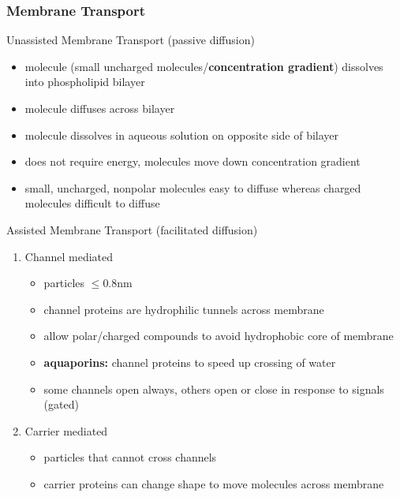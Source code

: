 \documentclass[11pt,fleqn]{book} %
\begin{document}
\subsubsection{Membrane Transport}
\begin{descriptions}
    \item[Unassisted Membrane Transport (passive diffusion)]\begin{descriptions}
    \end{descriptions}
    \begin{itemize}
        \item molecule (small uncharged molecules/\textbf{concentration gradient}) dissolves into phospholipid bilayer
        \item molecule diffuses across bilayer
        \item molecule dissolves in aqueous solution on opposite side of bilayer
        \item does not require energy, molecules move down concentration gradient
        \item small, uncharged, nonpolar molecules easy to diffuse whereas charged molecules difficult to diffuse
    \end{itemize}
    \item[Assisted Membrane Transport (facilitated diffusion)]\begin{descriptions}
    \end{descriptions}
    \begin{enumerate}
        \item Channel mediated
        \begin{itemize}
            \item particles $\leq$0.8nm
            \item channel proteins are hydrophilic tunnels across membrane
            \item allow polar/charged compounds to avoid hydrophobic core of membrane
            \item \textbf{aquaporins:} channel proteins to speed up crossing of water
            \item some channels open always, others open or close in response to signals (gated)
        \end{itemize}
        \item Carrier mediated
        \begin{itemize}
            \item particles that cannot cross channels
            \item carrier proteins can change shape to move molecules across membrane

\end{itemize}
\end{enumerate}
\end{descriptions}
\end{document}
